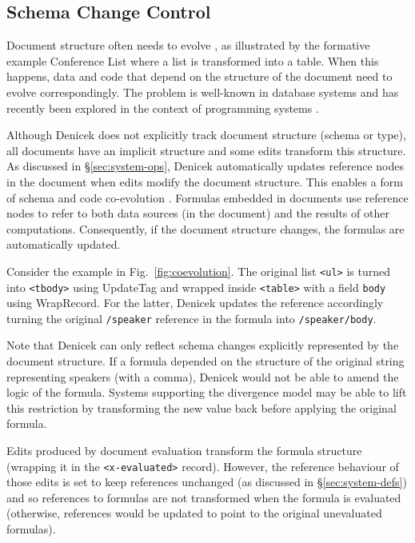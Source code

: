 \documentclass[sigconf]{acmart}
\newcommand{\diff}[1]{{#1}}
\newcommand{\note}[1]{}
\newcommand{\ident}[1]{{\sffamily #1}}
\begin{document}

\subsection{Schema Change Control}
\label{sec:impl-schema}

Document structure often needs to evolve \cite{burnett-2014-silos}, as illustrated by the formative
example Conference List where a list is transformed into a table. When this happens,
data and code that depend on the structure of the document need to evolve correspondingly.
The problem is well-known in database systems \cite{rahm-2006-schema} and has recently been
explored in the context of programming systems \cite{edwards-2025-schema}.

Although Denicek does not explicitly track document structure (schema or type), all documents
have an implicit structure and some edits transform this structure. As
discussed in \S\ref{sec:system-ops}, Denicek automatically updates reference nodes in the
document when edits modify the document structure. This enables a form of schema and code
co-evolution \cite{edwards-2025-schema}. Formulas embedded in documents use reference
nodes to refer to both data sources (in the document) and the results of other computations.
Consequently, if the document structure changes, the formulas are automatically updated.

Consider the example in Fig.~\ref{fig:coevolution}. The original list {\small\Verb_<ul>_} is
turned into {\small\Verb_<tbody>_} using \ident{UpdateTag} and wrapped inside {\small\Verb_<table>_}
with a field {\small\Verb_body_} using \ident{WrapRecord}. For the latter, Denicek updates the
reference accordingly turning the original {\small\Verb_/speaker_} reference in the formula
into {\small\Verb_/speaker/body_}.

\diff{Note that Denicek can only reflect schema changes explicitly represented by the document
structure. If a formula depended on the structure of the original string representing speakers
(with a comma), Denicek would not be able to amend the logic of the formula. Systems supporting
the divergence model \cite{edwards-2025-schema} may be able to lift this restriction by
transforming the new value back before applying the original formula.}
\note{Added response to R3's question about schema change}

Edits produced by document evaluation transform the formula structure (wrapping it in the
{\small\Verb_<x-evaluated>_} record). However, the reference behaviour of those edits is set
to keep references unchanged (as discussed in \S\ref{sec:system-defs}) and so references to
formulas are not transformed when the formula is evaluated (otherwise, references
would be updated to point to the original unevaluated formulas).
\end{document}
